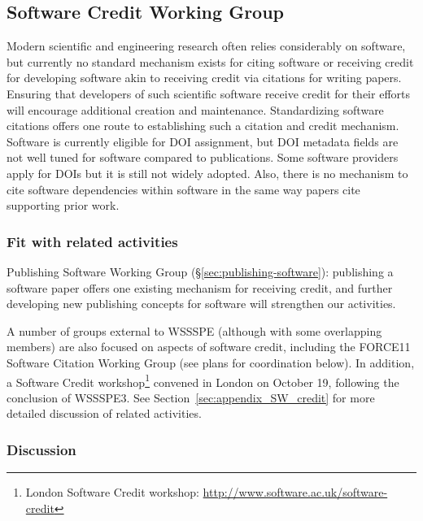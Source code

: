 \subsection{Software Credit Working Group}
\label{sec:software-credit}


Modern scientific and engineering research often relies considerably on software, 
but currently no standard mechanism exists for citing software or receiving 
credit for developing software akin to receiving credit via citations for 
writing papers. Ensuring that developers of such scientific software receive 
credit for their efforts will encourage additional creation and maintenance. 
Standardizing software citations offers one route to establishing such a
citation and credit mechanism. Software is currently eligible for DOI
assignment, but DOI metadata fields are not well tuned for software compared to
publications. Some software providers apply for DOIs but it is still not widely
adopted. Also, there is no mechanism to cite software dependencies within
software in the same way papers cite supporting prior work.

\subsubsection{Fit with related activities}

Publishing Software Working Group (\S\ref{sec:publishing-software}): publishing
a software paper offers one existing mechanism for receiving credit, and further
developing new publishing concepts for software will strengthen our activities.

A number of groups external to WSSSPE (although with some overlapping members)
are also focused on aspects of software credit, including the FORCE11 Software
Citation Working Group (see plans for coordination below). In addition, a
Software Credit workshop\footnote{London Software Credit workshop:
\url{http://www.software.ac.uk/software-credit}} convened in London on October
19, following the conclusion of WSSSPE3. See
Section~\ref{sec:appendix_SW_credit} for more detailed discussion of related
activities.

\subsubsection{Discussion}


